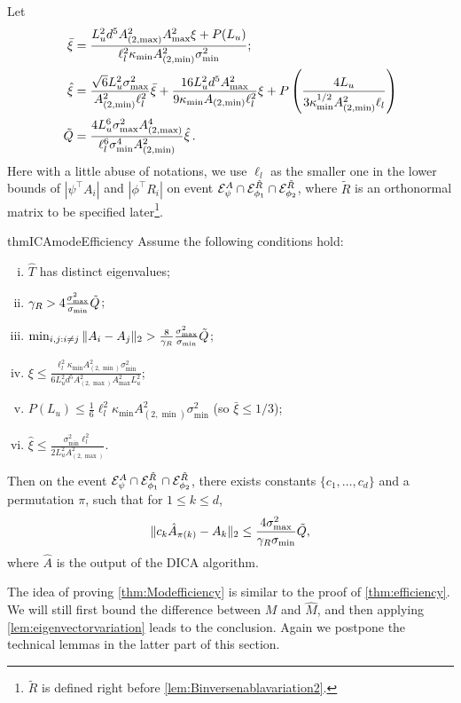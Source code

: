 Let 
\begin{align*}
\bar{\xi} &=   \frac{L_u^2d^5 A_{(2,\max)}^2A_{\max}^2\xi + P(L_u)}{\ell_l^2\kappa_{\min}A^2_{(2,\min)}\sigma_{\min}^2}; \\
\hat{\xi} &=
\frac{\sqrt{6}L_u^2\sigma_{\max}^2}{A^2_{(2,\min)}\ell_l^2}\bar{\xi}
+
\frac{16L_u^2d^5A^2_{\max}}{9\kappa_{\min}A_{(2,\min)}\ell_l^2}\xi
+
P\left(\frac{4L_u}{3\kappa_{\min}^{1/2}A^2_{(2,\min)}\ell_l}\right)\\
\tilde{Q} &=  
\frac{4L_u^6\sigma^2_{\max}A^4_{(2,\max)}}{\ell_l^6\sigma^4_{\min}A^2_{(2,\min)}}\hat{\xi}\,.
\end{align*} 
Here with a little abuse of notations, we use $\ell_l$ as the smaller one in the lower bounds of $|\psi^{\top}A_i|$ and $|\phi^{\top}R_i|$ on event $\mathcal{E}^A_{\psi}\cap\mathcal{E}^{\tilde{R}}_{\phi_1}\cap\mathcal{E}^{\tilde{R}}_{\phi_2}$, where $\tilde{R}$ is an orthonormal matrix to be specified later\footnote{$\tilde{R}$ is defined right before \cref{lem:Binversenablavariation2}.}.
\begin{restatable}{thm}{ICAmodeEfficiency}
	\label{thm:Modefficiency}
	Assume the following conditions hold:
	\begin{enumerate}[(i):]
		\itemsep0em
		\item $\hat{T}$ has distinct eigenvalues; \label{cond:A41_1}
		\item $\gamma_R > 4 \frac{\sigma_{\max}^2}{\sigma_{\min}}\tilde{Q}$; \label{cond:A41_2}
		\item $\min_{i,j:i\neq j} \|A_i - A_j\|_2 > \frac{8}{\gamma_R}\frac{\sigma_{\max}^2}{\sigma_{\min}} \tilde{Q}$;\label{cond:A41_3}
		\item $\xi \le \frac{\ell_l^2\kappa_{\min}A^2_{(2,\min)}\sigma_{\min}^2}{6L_u^2d^5A_{(2,\max)}^2A_{\max}^2L_u^2}$;\label{cond:A41_4}
		\item $P(L_u) \le \frac{1}{6}\ell_l^2\kappa_{\min}A^2_{(2,\min)}\sigma_{\min}^2$
		(so $\bar{\xi} \le 1/3$);\label{cond:A41_5}
		\item $\hat{\xi}
		\le\frac{\sigma^2_{\min}\ell_l^2}{2L^2_uA^2_{(2,\max)}}$. \label{cond:A41_6}
	\end{enumerate}
	Then on the event $\mathcal{E}^A_{\psi}\cap\mathcal{E}^{\tilde{R}}_{\phi_1}\cap\mathcal{E}^{\tilde{R}}_{\phi_2}$, there exists constants $\{c_1,\ldots,c_d\}$ and  a permutation $\pi$, such that for $1\le k\le d$,
	\[
	\| c_k\hat{A}_{\pi(k)} - A_k\|_2 \le \frac{4\sigma^2_{\max}}{\gamma_R\sigma_{\min}} \tilde{Q},
	\]
	where $\hat{A}$ is the output of the DICA algorithm.
\end{restatable}
The idea of proving \cref{thm:Modefficiency} is similar to the proof of \cref{thm:efficiency}.
We will still first bound the difference between $M$ and $\hat{M}$, and then applying \cref{lem:eigenvectorvariation} leads to the conclusion.
Again we postpone the technical lemmas in the latter part of this section. 

